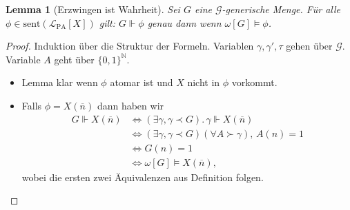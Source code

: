 \documentclass[nofonts]{uebung}
\newtheorem{lemma}[theorem]{Lemma}
\DeclareMathOperator{\dom}{dom}
\begin{document}
\begin{lemma}[Erzwingen ist Wahrheit]
    Sei $G$ eine $\mathcal G$-generische Menge. 
    Für alle $\phi\in \mathrm{sent}(\mathcal L_{\mathrm{PA}}[X])$ gilt:
    $G\Vdash \phi$ genau dann wenn $\omega[G]\vDash \phi$.
\end{lemma}
\begin{proof}
    Induktion über die Struktur der Formeln. Variablen $\gamma, \gamma', \tau$ gehen über $\mathcal G$. Variable $A$ geht über $\{0,1\}^{\mathbb{N}}$.
    \begin{itemize}
        \item Lemma klar wenn $\phi$ atomar ist und $X$ nicht in $\phi$ vorkommt.
        \item Falls $\phi=X(\overline n)$ dann haben wir
            \begin{align*}
                G\Vdash X(\overline n) &\iff (\exists \gamma, \gamma\prec G).\,\gamma\Vdash X(\overline n)\\
                             &\iff (\exists \gamma, \gamma\prec G)(\forall A\succ \gamma),\, A(n)=1\\
                             &\iff G(n)=1 \\
                             &\iff \omega[G]\vDash X(\overline n),
            \end{align*}
            wobei die ersten zwei Äquivalenzen aus Definition folgen.

\end{itemize}
\end{proof}
\end{document}
